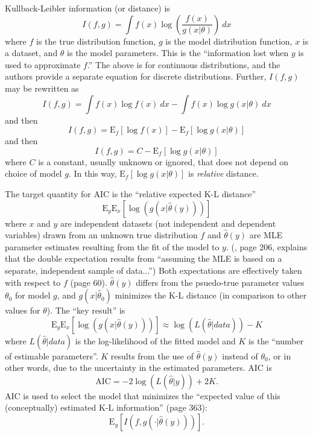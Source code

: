 Kullback-Leibler information (or distance) is
\begin{equation}
	I(f,g) = \int f(x) \log \left ( \frac{f(x)}{g(x|\theta)} \right ) ~dx
\end{equation}
where $f$ is the true distribution function, $g$ is the model distribution function, $x$ is a dataset, and $\theta$ is the model parameters. This is the ``information lost when $g$ is used to approximate $f$.'' The above is for continuous distributions, and the authors provide a separate equation for discrete distributions. Further, $I(f,g)$ may be rewritten as
\begin{equation}
	I(f,g) = \int f(x) \log f(x) ~dx - \int f(x) \log g(x|\theta) ~dx
\end{equation}
and then
\begin{equation}
	I(f,g) = \mathrm{E}_f[\log f(x)] - \mathrm{E}_f[\log g(x|\theta)]
\end{equation}
and then
\begin{equation}
	I(f,g) = C - \mathrm{E}_f[\log g(x|\theta)]
\end{equation}
where $C$ is a constant, usually unknown or ignored, that does not depend on choice of model $g$. In this way, $\mathrm{E}_f[\log g(x|\theta)]$ is \emph{relative} distance.

The target quantity for AIC is the ``relative expected K-L distance''
\begin{equation}
	\mathrm{E}_y \mathrm{E}_x [\log( g(x | \hat \theta(y)) )]
\end{equation}
where $x$ and $y$ are independent datasets (not independent and dependent variables) drawn from an unknown true distribution $f$ and $\hat \theta(y)$ are MLE parameter estimates resulting from the fit of the model to $y$. 
(\cite{Kuha2004}, page 206, explains that the double expectation results from ``assuming the MLE is based on a separate, independent sample of data...'')
Both expectations are effectively taken with respect to $f$ (page 60). $\hat \theta(y)$ differs from the psuedo-true parameter values $\theta_0$ for model $g$, and $g(x | \hat \theta_0)$ minimizes the K-L distance (in comparison to other values for $\theta$). The ``key result'' is
\begin{equation}
	\mathrm{E}_y \mathrm{E}_x [\log( g(x | \hat \theta(y)) )] \approx
	\log( L(\hat \theta | data ) ) - K
\end{equation}
where $L(\hat \theta| data)$ is the log-likelihood of the fitted model and $K$ is the ``number of estimable parameters''. $K$ results from the use of $\hat \theta(y)$ instead of $\theta_0$, or in other words, due to the uncertainty in the estimated parameters. AIC is
\begin{equation}
	\mathrm{AIC} = -2 \log(  L(\hat \theta|y)  ) + 2K
.\end{equation}
AIC is used to select the model that minimizes the ``expected value of this (conceptually) estimated K-L information'' (page 363):
\begin{equation}
	\mathrm{E}_y \left [ I(f, g(\cdot | \hat \theta (y) )) \right ]
.\end{equation}

